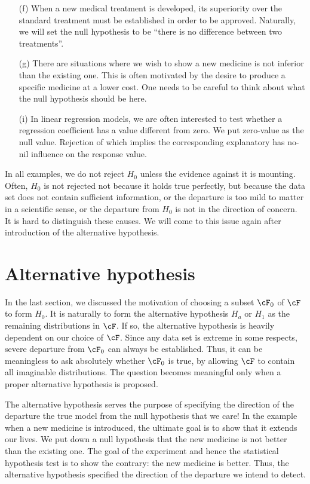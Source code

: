 \begin{itemize}
\item[(f)]
When a new medical treatment is developed, its superiority
over the standard treatment must be established in order to
be approved. Naturally, we will set the null hypothesis to be
``there is no difference between two treatments''.

\item[(g)]
There are situations where we wish to show a new medicine is
not inferior than the existing one. This is often motivated by the desire
to produce a specific medicine at a lower cost. One needs to be
careful to think about what the null hypothesis should be here.

\item[(i)]
In linear regression models, we are often interested to test
whether a regression coefficient has a value different from zero. 
We put zero-value as the null value. Rejection of which
implies the corresponding explanatory has no-nil influence
on the response value.
\end{itemize}

In all examples, we do not reject $H_0$ unless the evidence
against it is mounting. Often, $H_0$ is not rejected not because
it holds true perfectly, but because the data set does not contain sufficient
information, or the departure is too mild to matter in a scientific sense, 
or the departure from $H_0$ is not in the direction of concern.
It is hard to distinguish these causes.
We will come to this issue again after introduction of the
alternative hypothesis.

\section{Alternative hypothesis}

In the last section, we discussed the motivation of choosing
a subset $\cF_0$ of $\cF$ to form $H_0$. It is naturally to form
the alternative hypothesis $H_a$ or $H_1$ as the
remaining distributions in $\cF$. If so, the alternative
hypothesis is heavily dependent on our choice of $\cF$.
Since any data set is extreme in some respects,
severe departure from $\cF_0$ can always be established.
Thus, it can be meaningless to ask absolutely whether $\cF_0$
is true, by allowing $\cF$ to contain all imaginable distributions.
The question becomes meaningful only
when a proper alternative hypothesis is proposed.

The alternative hypothesis serves the purpose of
specifying the direction of the departure the true model from the null
hypothesis that we care! In the example when a new medicine is
introduced, the ultimate goal is to show that it extends our lives.
We put down a null hypothesis that the new medicine is not
better than the existing one. The goal of the experiment and hence
the statistical hypothesis test is to show the contrary: the new
medicine is better. Thus, the alternative hypothesis specified the
direction of the departure we intend to detect.

